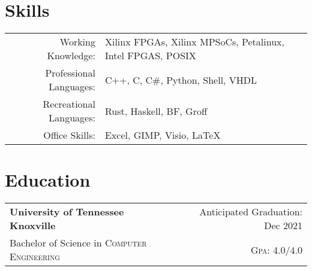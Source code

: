 \documentclass[a4paper,11pt]{article}
\begin{document}

\pagestyle{empty} %

\par{ \smallskip\par}



\section{Skills}
\begin{tabularx}{\textwidth}{rl}
   Working Knowledge: & Xilinx FPGAs, Xilinx MPSoCs, Petalinux, Intel FPGAS, POSIX\\
   Professional Languages:& C++, C, C\#, Python, Shell, VHDL\\
   Recreational Languages:& Rust, Haskell, BF, Groff \\
   Office Skills: & Excel, GIMP, Visio, \LaTeX{}\\
\end{tabularx}

\section{Education}
\begin{tabularx}{\textwidth}{lXr}
   \textbf{University of Tennessee Knoxville} & & Anticipated Graduation: Dec 2021\\
   Bachelor of Science in \textsc{Computer Engineering} &  & \normalsize \textsc{Gpa}: 4.0/4.0\\
\end{tabularx}
\end{document}
